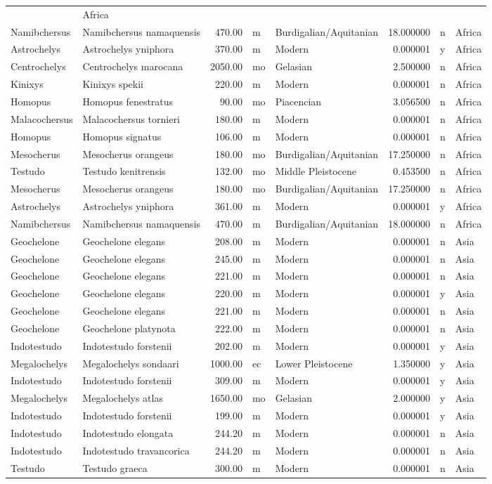 \begin{landscape}
\begin{longtable}[]{@{}llrllrll@{}}
	& Africa\tabularnewline
	Namibchersus & Namibchersus namaquensis & 470.00 & m &
	Burdigalian/Aquitanian & 18.000000 & n & Africa\tabularnewline
	Astrochelys & Astrochelys yniphora & 370.00 & m & Modern & 0.000001 & y
	& Africa\tabularnewline
	Centrochelys & Centrochelys marocana & 2050.00 & mo & Gelasian &
	2.500000 & n & Africa\tabularnewline
	Kinixys & Kinixys spekii & 220.00 & m & Modern & 0.000001 & n &
	Africa\tabularnewline
	Homopus & Homopus fenestratus & 90.00 & mo & Piacencian & 3.056500 & n &
	Africa\tabularnewline
	Malacochersus & Malacochersus tornieri & 180.00 & m & Modern & 0.000001
	& n & Africa\tabularnewline
	Homopus & Homopus signatus & 106.00 & m & Modern & 0.000001 & n &
	Africa\tabularnewline
	Mesocherus & Mesocherus orangeus & 180.00 & mo & Burdigalian/Aquitanian
	& 17.250000 & n & Africa\tabularnewline
	Testudo & Testudo kenitrensis & 132.00 & mo & Middle Pleistocene &
	0.453500 & n & Africa\tabularnewline
	Mesocherus & Mesocherus orangeus & 180.00 & mo & Burdigalian/Aquitanian
	& 17.250000 & n & Africa\tabularnewline
	Astrochelys & Astrochelys yniphora & 361.00 & m & Modern & 0.000001 & y
	& Africa\tabularnewline
	Namibchersus & Namibchersus namaquensis & 470.00 & m &
	Burdigalian/Aquitanian & 18.000000 & n & Africa\tabularnewline
	Geochelone & Geochelone elegans & 208.00 & m & Modern & 0.000001 & n &
	Asia\tabularnewline
	Geochelone & Geochelone elegans & 245.00 & m & Modern & 0.000001 & n &
	Asia\tabularnewline
	Geochelone & Geochelone elegans & 221.00 & m & Modern & 0.000001 & n &
	Asia\tabularnewline
	Geochelone & Geochelone elegans & 220.00 & m & Modern & 0.000001 & y &
	Asia\tabularnewline
	Geochelone & Geochelone elegans & 221.00 & m & Modern & 0.000001 & n &
	Asia\tabularnewline
	Geochelone & Geochelone platynota & 222.00 & m & Modern & 0.000001 & n &
	Asia\tabularnewline
	Indotestudo & Indotestudo forstenii & 202.00 & m & Modern & 0.000001 & y
	& Asia\tabularnewline
	Megalochelys & Megalochelys sondaari & 1000.00 & ec & Lower Pleistocene
	& 1.350000 & y & Asia\tabularnewline
	Indotestudo & Indotestudo forstenii & 309.00 & m & Modern & 0.000001 & y
	& Asia\tabularnewline
	Megalochelys & Megalochelys atlas & 1650.00 & mo & Gelasian & 2.000000 &
	y & Asia\tabularnewline
	Indotestudo & Indotestudo forstenii & 199.00 & m & Modern & 0.000001 & y
	& Asia\tabularnewline
	Indotestudo & Indotestudo elongata & 244.20 & m & Modern & 0.000001 & n
	& Asia\tabularnewline
	Indotestudo & Indotestudo travancorica & 244.20 & m & Modern & 0.000001
	& n & Asia\tabularnewline
	Testudo & Testudo graeca & 300.00 & m & Modern & 0.000001 & n &
	Asia\tabularnewline

\end{longtable}
\end{landscape}
